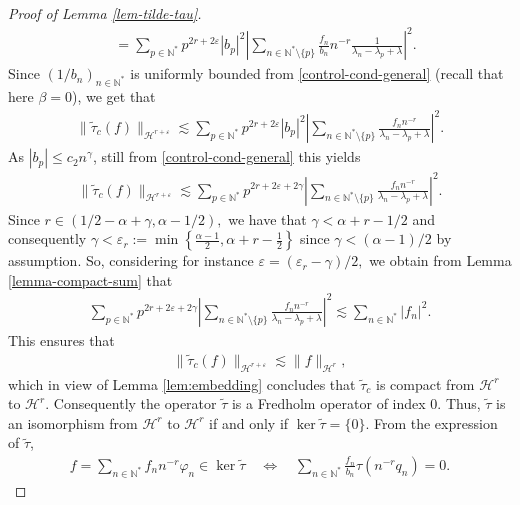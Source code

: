 \documentclass[11pt, dvipsnames]{amsart}
\begin{document}
\begin{proof}[Proof of Lemma \ref{lem-tilde-tau}]
\begin{align*}
        &=\sum_{p\in \mathbb{N^*}}p^{2r+2\varepsilon}|b_p|^2\left|\sum_{n\in \mathbb{N}^*\setminus\{p\}}\frac{f_n}{b_n} n^{-r}\frac{1}{\lambda_n-\lambda_p+\lambda}\right|^2.
    \end{align*}
    Since $(1/b_n)_{n\in \mathbb{N}^*}$ is uniformly bounded from \eqref{control-cond-general} (recall that here $\beta=0$), we get that
   \begin{align*}
    \|\tilde \tau_c(f)\|_{\mathcal{H}^{r+\varepsilon}}\lesssim  \sum_{p\in \mathbb{N^*}}p^{2r+2\varepsilon}|b_p|^2\left|\sum_{n\in \mathbb{N}^*\setminus\{p\}} \frac{f_n n^{-r}}{\lambda_n-\lambda_p+\lambda}\right|^2.
   \end{align*} 
   As $|b_p|\leq c_2 n^{\gamma}$, still from \eqref{control-cond-general} this yields
   \begin{align*}
    \|\tilde \tau_c(f)\|_{\mathcal{H}^{r+\varepsilon}}\lesssim  \sum_{p\in \mathbb{N^*}}p^{2r+2\varepsilon+2\gamma}\left|\sum_{n\in \mathbb{N}^*\setminus\{p\}} \frac{f_n n^{-r}}{\lambda_n-\lambda_p+\lambda}\right|^2.
   \end{align*}
   Since $r\in (1/2-\alpha+\gamma,\alpha-1/2),$ we have that $\gamma<\alpha+r-1/2$ and consequently $\gamma<\varepsilon_r:=\min\left\{\frac{\alpha-1}{2},\alpha+r-\frac{1}{2}\right\}$ since $\gamma<(\alpha-1)/2$ by assumption. So, considering for instance $\varepsilon=(\varepsilon_r-\gamma)/2,$ we obtain from Lemma \ref{lemma-compact-sum} that
   \begin{align*}
       \sum_{p\in \mathbb{N^*}}p^{2r+2\varepsilon+2\gamma}\left|\sum_{n\in \mathbb{N}^*\setminus\{p\}} \frac{f_n n^{-r}}{\lambda_n-\lambda_p+\lambda}\right|^2\lesssim \sum_{n\in \mathbb{N^*}}|f_n|^2.
   \end{align*}
   This ensures that
   \begin{align*}
      \|\tilde \tau_c(f)\|_{\mathcal{H}^{r+\varepsilon}}\lesssim \|f\|_{\mathcal{H}^r}, 
   \end{align*} 
   which in view of Lemma \ref{lem:embedding} concludes that $\tilde \tau_c$ is compact from $\mathcal{H}^r$ to $\mathcal{H}^r.$ Consequently the operator $\tilde \tau$ is a Fredholm operator of index $0.$ Thus, $\tilde \tau$ is an isomorphism from $\mathcal{H}^r$ to $\mathcal{H}^r$ if and only if $\ker \tilde \tau=\{0\}.$ From the expression of $\tilde{\tau}$,
   \begin{align*}
      f=\displaystyle\sum_{n\in \mathbb{N^*}}f_n n^{-r}\varphi_n\in \ker \tilde \tau\quad \Leftrightarrow \quad \sum_{n\in \mathbb{N^*}}\frac{f_n}{b_n} \tau(n^{-r} q_n)=0.
   \end{align*}

\end{proof}
\end{document}
